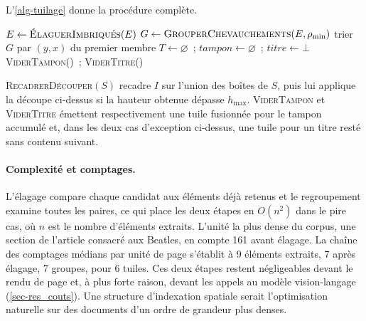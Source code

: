 L'\cref{alg-tuilage} donne la procédure complète.

\begin{algorithm}[t]
\caption{Tuilage adaptatif guidé par le DOM}
\label{alg-tuilage}
\DontPrintSemicolon
{}
$E \leftarrow \text{\normalfont\textsc{ÉlaguerImbriqués}}(E)$ 
$G \leftarrow \text{\normalfont\textsc{GrouperChevauchements}}(E, \rho_{\min})$ 
trier $G$ par $(y, x)$ du premier membre\;
$T \leftarrow \varnothing$~; $\textit{tampon} \leftarrow \varnothing$~; $\textit{titre} \leftarrow \bot$\;
\textsc{ViderTampon}()~; \textsc{ViderTitre}()\;
\;
\end{algorithm}

\noindent
\textsc{RecadrerDécouper}$(S)$ recadre $I$ sur l'union des boîtes de $S$, puis
lui applique la découpe ci-dessus si la hauteur obtenue dépasse $h_{\max}$.
\textsc{ViderTampon} et \textsc{ViderTitre} émettent respectivement une tuile
fusionnée pour le tampon accumulé et, dans les deux cas d'exception ci-dessus,
une tuile pour un titre resté sans contenu suivant.

\paragraph{Complexité et comptages.} L'élagage compare chaque candidat aux
éléments déjà retenus et le regroupement examine toutes les paires, ce qui
place les deux étapes en $O(n^2)$ dans le pire cas, où $n$ est le nombre
d'éléments extraits. L'unité la plus dense du corpus, une section de l'article
consacré aux Beatles, en compte \num{161} avant élagage. La chaîne des
comptages médians par unité de page s'établit à
9 éléments extraits, 7 après
élagage, 7 groupes, pour 6 tuiles. Ces deux
étapes restent négligeables devant le rendu de page et, à plus forte raison,
devant les appels au modèle vision-langage (\cref{sec-res_couts}). Une
structure d'indexation spatiale serait l'optimisation naturelle sur des
documents d'un ordre de grandeur plus denses.

